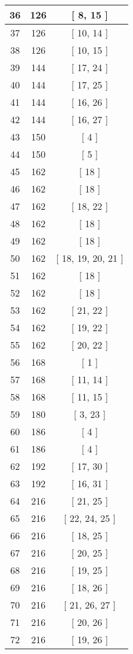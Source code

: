 \begin{center}
\begin{longtable}[H]{|| c c c ||}
36 & 126 & [ 8, 15 ] \\ 
\hline
37 & 126 & [ 10, 14 ] \\ 
\hline
38 & 126 & [ 10, 15 ] \\ 
\hline
39 & 144 & [ 17, 24 ] \\ 
\hline
40 & 144 & [ 17, 25 ] \\ 
\hline
41 & 144 & [ 16, 26 ] \\ 
\hline
42 & 144 & [ 16, 27 ] \\ 
\hline
43 & 150 & [ 4 ] \\ 
\hline
44 & 150 & [ 5 ] \\ 
\hline
45 & 162 & [ 18 ] \\ 
\hline
46 & 162 & [ 18 ] \\ 
\hline
47 & 162 & [ 18, 22 ] \\ 
\hline
48 & 162 & [ 18 ] \\ 
\hline
49 & 162 & [ 18 ] \\ 
\hline
50 & 162 & [ 18, 19, 20, 21 ] \\ 
\hline
51 & 162 & [ 18 ] \\ 
\hline
52 & 162 & [ 18 ] \\ 
\hline
53 & 162 & [ 21, 22 ] \\ 
\hline
54 & 162 & [ 19, 22 ] \\ 
\hline
55 & 162 & [ 20, 22 ] \\ 
\hline
56 & 168 & [ 1 ] \\ 
\hline
57 & 168 & [ 11, 14 ] \\ 
\hline
58 & 168 & [ 11, 15 ] \\ 
\hline
59 & 180 & [ 3, 23 ] \\ 
\hline
60 & 186 & [ 4 ] \\ 
\hline
61 & 186 & [ 4 ] \\ 
\hline
62 & 192 & [ 17, 30 ] \\ 
\hline
63 & 192 & [ 16, 31 ] \\ 
\hline
64 & 216 & [ 21, 25 ] \\ 
\hline
65 & 216 & [ 22, 24, 25 ] \\ 
\hline
66 & 216 & [ 18, 25 ] \\ 
\hline
67 & 216 & [ 20, 25 ] \\ 
\hline
68 & 216 & [ 19, 25 ] \\ 
\hline
69 & 216 & [ 18, 26 ] \\ 
\hline
70 & 216 & [ 21, 26, 27 ] \\ 
\hline
71 & 216 & [ 20, 26 ] \\ 
\hline
72 & 216 & [ 19, 26 ] \\ 

\end{longtable}
\end{center}
